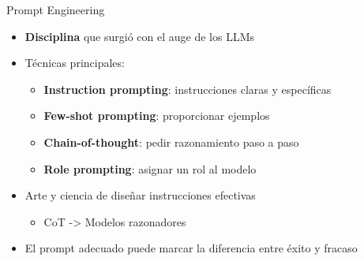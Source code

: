 \begin{frame}{Prompt Engineering}

\begin{itemize}
    \item \textbf{Disciplina} que surgió con el auge de los LLMs
    \item Técnicas principales:
    \begin{itemize}
        \item \textbf{Instruction prompting}: instrucciones claras y específicas
        \item \textbf{Few-shot prompting}: proporcionar ejemplos
        \item \textbf{Chain-of-thought}: pedir razonamiento paso a paso
        \item \textbf{Role prompting}: asignar un rol al modelo
    \end{itemize}
    \item Arte y ciencia de diseñar instrucciones efectivas
    \begin{itemize}
        \item CoT -> Modelos razonadores
    \end{itemize}
    \item El prompt adecuado puede marcar la diferencia entre éxito y fracaso
\end{itemize}



\end{frame}





